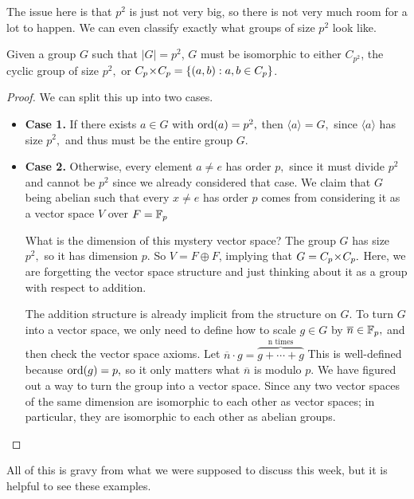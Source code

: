 The issue here is that $p^2$ is just not very big, so there is not very much room for a lot to happen.
We can even classify exactly what groups of size $p^2$ look like.
\begin{corollary}
Given a group $G$ such that $|G| = p^2$, $G$ must be isomorphic to either $C_{p^2}$, the cyclic group of size $p^2,$ or $C_p \hspace{0.05em}{\times}\hspace{0.05em} C_p = \{(a, b): a, b \in C_p\}$. 
\end{corollary}


\begin{proof}

We can split this up into two cases.
\begin{itemize}
    \item \textbf{Case 1.} If there exists $a \in G$ with $\operatorname{ord}(a) = p^2,$ then $\langle a \rangle = G,$ since $\langle a \rangle$ has size $p^2,$ and thus must be the entire group $G.$ 
    
    \item \textbf{Case 2.} Otherwise, every element $a \neq e$ has order $p,$ since it must divide $p^2$ and cannot be $p^2$ since we already considered that case. We claim that $G$ being abelian such that every $x \neq e$ has order $p$ comes from considering it as a vector space $V$ over $F = \mathbb F_p$ %
    
    What is the dimension of this mystery vector space? The group $G$ has size $p^2,$ so it has dimension $p.$ So $V = F \oplus F$, implying that $G = C_p \hspace{0.05em}{\times}\hspace{0.05em} C_p.$ Here, we are forgetting the vector space structure and just thinking about it as a group with respect to addition.
    
    The addition structure is already implicit from the structure on $G.$ To turn $G$ into a vector space, we only need to define how to scale $g \in G$ by $\overline{n} \in \mathbb F_p,$ and then check the vector space axioms. Let $\overline{n} \cdot g = \overbrace{g + \cdots + g}^{\text{n times}}$ This is well-defined because $\operatorname{ord}(g) = p,$ so it only matters what $\overline{n}$ is modulo $p.$
    We have figured out a way to turn the group into a vector space. Since any two vector spaces of the same dimension are isomorphic to each other as vector spaces; in particular, they are isomorphic to each other as abelian groups.

\end{itemize}

\end{proof}


All of this is gravy from what we were supposed to discuss this week, but it is helpful to see these examples.

\newpage